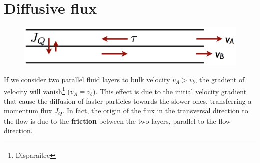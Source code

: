 \section{Diffusive flux}
\begin{figure}
	\vspace{-5mm}
	\includegraphics[scale=0.26]{ch1/4}
\end{figure}
If we consider two parallel fluid layers to bulk velocity $v_A > v_b$, the gradient of velocity will vanish\footnote{Disparaître} ($v_A = v_b$). This effect is due to the initial velocity gradient that cause the diffusion of faster particles towards the slower ones, transferring a momentum flux $J_Q$. In fact, the origin of the flux in the transversal direction to the flow is due to the \textbf{friction} between the two layers, parallel to the flow direction. 
	
